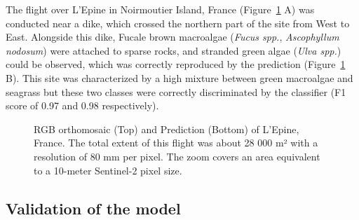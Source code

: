 \documentclass[
  number]{elsarticle}
\begin{document}
The flight over L'Epine in Noirmoutier Island, France
(Figure~\ref{fig-Dike} A) was conducted near a dike, which crossed the
northern part of the site from West to East. Alongside this dike, Fucale
brown macroalgae (\emph{Fucus spp.}, \emph{Ascophyllum nodosum}) were
attached to sparse rocks, and stranded green algae (\emph{Ulva spp.})
could be observed, which was correctly reproduced by the prediction
(Figure~\ref{fig-Dike} B). This site was characterized by a high mixture
between green macroalgae and seagrass but these two classes were
correctly discriminated by the classifier (F1 score of 0.97 and 0.98
respectively).

\label{cell-fig-Dike}
\begin{figure}[H]


\caption{\label{fig-Dike}RGB orthomosaic (Top) and Prediction (Bottom)
of L'Epine, France. The total extent of this flight was about 28 000 m²
with a resolution of 80 mm per pixel. The zoom covers an area equivalent
to a 10-meter Sentinel-2 pixel size.}

\end{figure}%

\subsection{Validation of the model}\label{validation-of-the-model}
\end{document}
